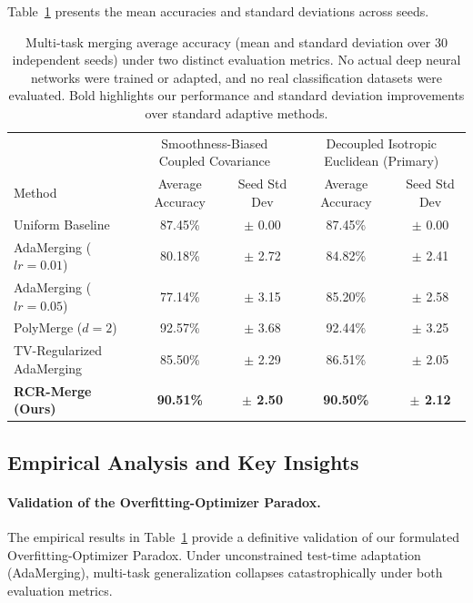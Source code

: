 Table~\ref{tab:main_results} presents the mean accuracies and standard deviations across seeds.

\begin{table}[t]
\caption{Multi-task merging average accuracy (mean and standard deviation over 30 independent seeds) under two distinct evaluation metrics. No actual deep neural networks were trained or adapted, and no real classification datasets were evaluated. Bold highlights our performance and standard deviation improvements over standard adaptive methods.}
\label{tab:main_results}
\vskip 0.15in
\begin{center}
\begin{small}
\begin{sc}
\begin{tabular}{l|cc|cc}
\toprule
& \multicolumn{2}{c|}{Smoothness-Biased Coupled Covariance} & \multicolumn{2}{c}{Decoupled Isotropic Euclidean (Primary)} \\
Method & Average Accuracy & Seed Std Dev & Average Accuracy & Seed Std Dev \\
\midrule
Uniform Baseline & 87.45\% & $\pm$ 0.00 & 87.45\% & $\pm$ 0.00 \\
AdaMerging ($lr=0.01$) & 80.18\% & $\pm$ 2.72 & 84.82\% & $\pm$ 2.41 \\
AdaMerging ($lr=0.05$) & 77.14\% & $\pm$ 3.15 & 85.20\% & $\pm$ 2.58 \\
PolyMerge ($d=2$) & 92.57\% & $\pm$ 3.68 & 92.44\% & $\pm$ 3.25 \\
TV-Regularized AdaMerging & 85.50\% & $\pm$ 2.29 & 86.51\% & $\pm$ 2.05 \\
\textbf{RCR-Merge (Ours)} & \textbf{90.51\%} & \textbf{$\pm$ 2.50} & \textbf{90.50\%} & \textbf{$\pm$ 2.12} \\
\bottomrule
\end{tabular}
\end{sc}
\end{small}
\end{center}
\vskip -0.1in
\end{table}

\subsection{Empirical Analysis and Key Insights}

\paragraph{Validation of the Overfitting-Optimizer Paradox.}
The empirical results in Table~\ref{tab:main_results} provide a definitive validation of our formulated Overfitting-Optimizer Paradox. Under unconstrained test-time adaptation (AdaMerging), multi-task generalization collapses catastrophically under both evaluation metrics. 

